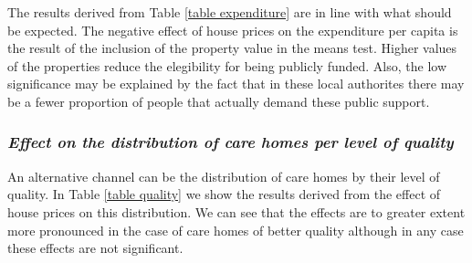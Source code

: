\documentclass[12pt,letterpaper]{article}
\begin{document}
The  results derived from Table \ref{table expenditure} are in line with what should be expected. The negative 
 effect of house prices on the expenditure per capita is the result of the 
 inclusion of the property value in the means test. Higher values of the 
 properties reduce the elegibility for being publicly funded. Also, the low 
 significance may be explained by the fact that in these local authorites there 
 may be a fewer proportion of people that actually demand these public support. 

\subsubsection*{\normalsize{\it Effect on the distribution of care homes per level of quality}}

An alternative channel can be the distribution of care homes by their level of 
quality. In Table \ref{table quality} we show the results derived from the effect of house 
prices on this distribution. We can see that the effects are to greater extent more pronounced in the case of care 
homes of better quality although in any case these effects are not significant.
\end{document}
